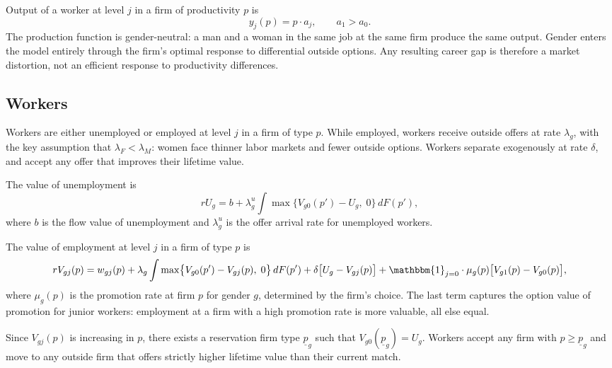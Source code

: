 \documentclass[11pt]{article}
\begin{document}
Output of a worker at level $j$ in a firm of productivity $p$ is
\begin{equation*}
    y_j(p) = p \cdot a_j, \qquad a_1 > a_0.
\end{equation*}
The production function is gender-neutral: a man and a woman in the same job at the same firm produce the same output. Gender enters the model entirely through the firm's optimal response to differential outside options. Any resulting career gap is therefore a market distortion, not an efficient response to productivity differences.

\subsection{Workers}

Workers are either unemployed or employed at level $j$ in a firm of type $p$. While employed, workers receive outside offers at rate $\lambda_g$, with the key assumption that $\lambda_F < \lambda_M$: women face thinner labor markets and fewer outside options. Workers separate exogenously at rate $\delta$, and accept any offer that improves their lifetime value.

The value of unemployment is
\begin{equation*}
    rU_g = b + \lambda_g^u \int \max\bigl\{V_{g0}(p') - U_g,\; 0\bigr\} \, dF(p'),
\end{equation*}
where $b$ is the flow value of unemployment and $\lambda_g^u$ is the offer arrival rate for unemployed workers.

The value of employment at level $j$ in a firm of type $p$ is
\begin{equation*}
    rV_{gj}(p) = w_{gj}(p) + \lambda_g \int \max\bigl\{V_{g0}(p') - V_{gj}(p),\; 0\bigr\} \, dF(p') + \delta\bigl[U_g - V_{gj}(p)\bigr] + \mathbbm{1}_{j=0} \cdot \mu_g(p)\bigl[V_{g1}(p) - V_{g0}(p)\bigr],
\end{equation*}
where $\mu_g(p)$ is the promotion rate at firm $p$ for gender $g$, determined by the firm's choice. The last term captures the option value of promotion for junior workers: employment at a firm with a high promotion rate is more valuable, all else equal.

Since $V_{gj}(p)$ is increasing in $p$, there exists a reservation firm type $\underline{p}_g$ such that $V_{g0}(\underline{p}_g) = U_g$. Workers accept any firm with $p \geq \underline{p}_g$ and move to any outside firm that offers strictly higher lifetime value than their current match.
\end{document}
